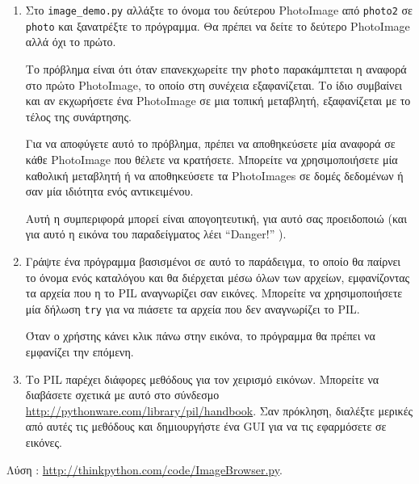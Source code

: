\documentclass[10pt]{book}
\begin{document}
\begin{exercise}
\begin{enumerate}
\item Στο \verb"image_demo.py"  αλλάξτε το όνομα του δεύτερου  PhotoImage  από 
 {\tt photo2}  σε  {\tt photo}  και ξανατρέξτε το πρόγραμμα.  Θα πρέπει να δείτε το δεύτερο  PhotoImage  αλλά όχι το πρώτο.

Το πρόβλημα είναι ότι όταν επανεκχωρείτε την  {\tt photo}  παρακάμπτεται η αναφορά στο 
πρώτο  PhotoImage,  το οποίο στη συνέχεια εξαφανίζεται.  Το ίδιο συμβαίνει και αν εκχωρήσετε ένα  PhotoImage  σε μια τοπική μεταβλητή, εξαφανίζεται με το τέλος της συνάρτησης.

Για να αποφύγετε αυτό το πρόβλημα, πρέπει να αποθηκεύσετε μία αναφορά σε κάθε  PhotoImage  που θέλετε να κρατήσετε.  Μπορείτε να χρησιμοποιήσετε μία καθολική μεταβλητή ή να αποθηκεύσετε τα  PhotoImages  σε δομές δεδομένων ή σαν μία ιδιότητα ενός αντικειμένου.

Αυτή η συμπεριφορά μπορεί είναι απογοητευτική, για αυτό σας προειδοποιώ (και για αυτό η εικόνα του παραδείγματος λέει  ``Danger!'' ).

\item Γράψτε ένα πρόγραμμα βασισμένοι σε αυτό το παράδειγμα, το οποίο θα παίρνει το όνομα 
ενός καταλόγου και θα διέρχεται μέσω όλων των αρχείων, εμφανίζοντας τα αρχεία που η το  PIL 
 αναγνωρίζει σαν εικόνες.  Μπορείτε να χρησιμοποιήσετε μία δήλωση  {\tt try}  για να πιάσετε τα αρχεία που δεν αναγνωρίζει το  PIL. 

Όταν ο χρήστης κάνει κλικ πάνω στην εικόνα, το πρόγραμμα θα πρέπει να εμφανίζει την επόμενη.

\item Το  PIL  παρέχει διάφορες μεθόδους για τον χειρισμό εικόνων.  
Μπορείτε να διαβάσετε σχετικά με αυτό στο σύνδεσμο  \url{http://pythonware.com/library/pil/handbook}.  
Σαν πρόκληση, διαλέξτε μερικές από αυτές τις μεθόδους και δημιουργήστε ένα  GUI  για 
να τις εφαρμόσετε σε εικόνες.

\end{enumerate}

Λύση : \url{http://thinkpython.com/code/ImageBrowser.py}.

\end{exercise}
\end{document}
